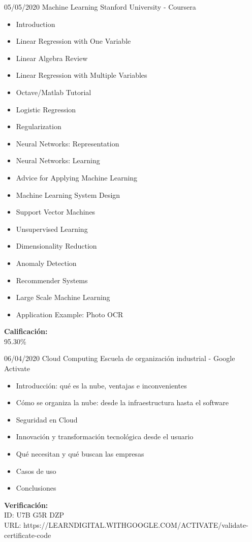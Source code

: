 \begin{entrylist}
	\entry
		{05/05/2020}
		{Machine Learning}
		{Stanford University - Coursera}
		{
		    \vspace{-5mm}
    	    \begin{itemize}
    	        \setlength\itemsep{0pt}
    	        \setlength\parskip{0pt}
    	        \item Introduction
    	        \item Linear Regression with One Variable
    	        \item Linear Algebra Review
    	        \item Linear Regression with Multiple Variables
    	        \item Octave/Matlab Tutorial
    	        \item Logistic Regression
    	        \item Regularization
    	        \item Neural Networks: Representation
    	        \item Neural Networks: Learning
    	        \item Advice for Applying Machine Learning
    	        \item Machine Learning System Design
    	        \item Support Vector Machines
    	        \item Unsupervised Learning
    	        \item Dimensionality Reduction
    	        \item Anomaly Detection
    	        \item Recommender Systems
    	        \item Large Scale Machine Learning
    	        \item Application Example: Photo OCR
    	    \end{itemize}
    	    \textbf{Calificación:} \\
    	    95.30\%
		}
	\entry
		{06/04/2020}
		{Cloud Computing}
		{Escuela de organización industrial - Google Activate}
		{
		    \vspace{-5mm}
		    \begin{itemize}
		        \setlength\itemsep{0pt}
    	        \setlength\parskip{0pt}
		        \item Introducción: qué es la nube, ventajas e inconvenientes
		        \item Cómo se organiza la nube: desde la infraestructura hasta el software
		        \item Seguridad en Cloud
		        \item Innovación y transformación tecnológica desde el usuario
		        \item Qué necesitan y qué buscan las empresas
		        \item Casos de uso
		        \item Conclusiones
		    \end{itemize}
		    
		    \textbf{Verificación:} \\
		    ID: U7B G5R DZP \\
		    URL: https://LEARNDIGITAL.WITHGOOGLE.COM/ACTIVATE/validate-certificate-code
		}
\end{entrylist}